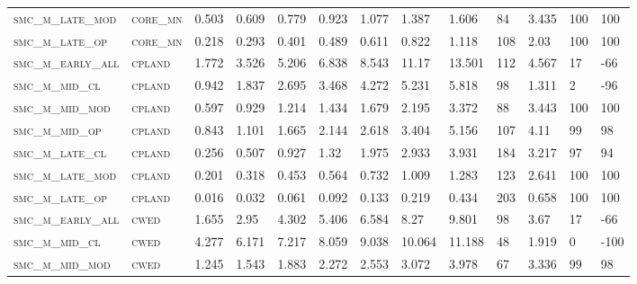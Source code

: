 \begin{landscape}
\begin{center}
\begin{footnotesize}
\begin{longtable}{lllllllllllll}
\textsc{smc\_m\_late\_mod } & \textsc{core\_mn  }   & 0.503    & 0.609    & 0.779    & 0.923    & 1.077    & 1.387    & 1.606    & 84     & 3.435         & 100           & 100      \\
\textsc{smc\_m\_late\_op  } & \textsc{core\_mn  }   & 0.218    & 0.293    & 0.401    & 0.489    & 0.611    & 0.822    & 1.118    & 108    & 2.03          & 100           & 100      \\
\textsc{smc\_m\_early\_all} & \textsc{cpland    }   & 1.772    & 3.526    & 5.206    & 6.838    & 8.543    & 11.17    & 13.501   & 112    & 4.567         & 17            & -66      \\
\textsc{smc\_m\_mid\_cl   } & \textsc{cpland    }   & 0.942    & 1.837    & 2.695    & 3.468    & 4.272    & 5.231    & 5.818    & 98     & 1.311         & 2             & -96      \\
\textsc{smc\_m\_mid\_mod  } & \textsc{cpland    }   & 0.597    & 0.929    & 1.214    & 1.434    & 1.679    & 2.195    & 3.372    & 88     & 3.443         & 100           & 100      \\
\textsc{smc\_m\_mid\_op   } & \textsc{cpland    }   & 0.843    & 1.101    & 1.665    & 2.144    & 2.618    & 3.404    & 5.156    & 107    & 4.11          & 99            & 98       \\
\textsc{smc\_m\_late\_cl  } & \textsc{cpland    }   & 0.256    & 0.507    & 0.927    & 1.32     & 1.975    & 2.933    & 3.931    & 184    & 3.217         & 97            & 94       \\
\textsc{smc\_m\_late\_mod } & \textsc{cpland    }   & 0.201    & 0.318    & 0.453    & 0.564    & 0.732    & 1.009    & 1.283    & 123    & 2.641         & 100           & 100      \\
\textsc{smc\_m\_late\_op  } & \textsc{cpland    }   & 0.016    & 0.032    & 0.061    & 0.092    & 0.133    & 0.219    & 0.434    & 203    & 0.658         & 100           & 100      \\
\textsc{smc\_m\_early\_all} & \textsc{cwed      }   & 1.655    & 2.95     & 4.302    & 5.406    & 6.584    & 8.27     & 9.801    & 98     & 3.67          & 17            & -66      \\
\textsc{smc\_m\_mid\_cl   } & \textsc{cwed      }   & 4.277    & 6.171    & 7.217    & 8.059    & 9.038    & 10.064   & 11.188   & 48     & 1.919         & 0             & -100     \\
\textsc{smc\_m\_mid\_mod  } & \textsc{cwed      }   & 1.245    & 1.543    & 1.883    & 2.272    & 2.553    & 3.072    & 3.978    & 67     & 3.336         & 99            & 98       \\

\end{longtable}
\end{footnotesize}
\end{center}
\end{landscape}
